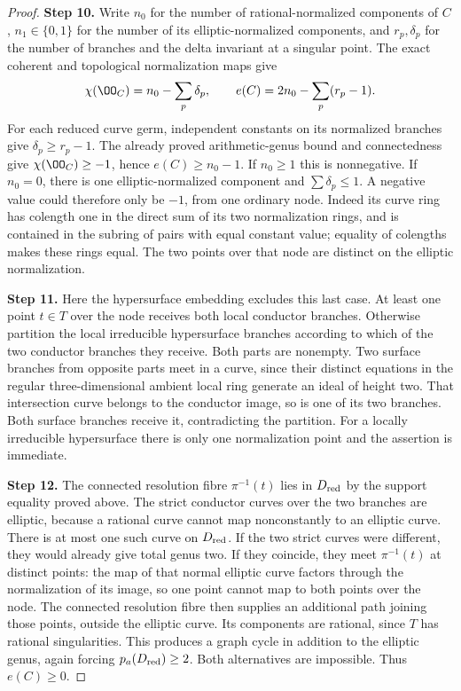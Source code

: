 \begin{proof}
\noindent\textbf{Step 10.} Write $n_0$ for the number of rational-normalized components
of $C$, $n_1\in\{0,1\}$ for the number of its
elliptic-normalized components, and $r_p,\delta_p$ for the
number of branches and the delta invariant at a singular
point. The exact coherent and topological normalization maps
give
\[
 \chi(\OO_C)=n_0-\sum_p\delta_p,
 \qquad e(C)=2n_0-\sum_p(r_p-1).
\]
For each reduced curve germ, independent constants on its
normalized branches give $\delta_p\ge r_p-1$.
The already proved arithmetic-genus bound and connectedness
give $\chi(\OO_C)\ge-1$, hence $e(C)\ge n_0-1$.
If $n_0\ge1$ this is nonnegative. If $n_0=0$, there is
one elliptic-normalized component and
$\sum\delta_p\le1$. A negative value could therefore only
be $-1$, from one ordinary node. Indeed its curve ring has
colength one in the direct sum of its two normalization
rings, and is contained in the subring of pairs with equal
constant value; equality of colengths makes these rings
equal. The two points over that node are distinct on the
elliptic normalization.

\noindent\textbf{Step 11.} Here the hypersurface embedding excludes this last case.
At least one point $t\in T$ over the node receives both
local conductor branches. Otherwise partition the local
irreducible hypersurface branches according to which of
the two conductor branches they receive. Both parts are
nonempty. Two surface branches from opposite parts meet
in a curve, since their distinct equations in the regular
three-dimensional ambient local ring generate an ideal
of height two. That intersection curve belongs to the
conductor image, so is one of its two branches. Both
surface branches receive it, contradicting the partition.
For a locally irreducible hypersurface there is only one
normalization point and the assertion is immediate.

\noindent\textbf{Step 12.} The connected resolution fibre $\pi^{-1}(t)$ lies in
$D_{\rm red}$ by the support equality proved above.
The strict conductor curves over the two branches are
elliptic, because a rational curve cannot map
nonconstantly to an elliptic curve. There is at most one
such curve on $D_{\rm red}$. If the two strict curves
were different, they would already give total genus two.
If they coincide, they meet $\pi^{-1}(t)$ at distinct
points: the map of that normal elliptic curve factors
through the normalization of its image, so one point
cannot map to both points over the node. The connected
resolution fibre then supplies an additional path joining
those points, outside the elliptic curve. Its components
are rational, since $T$ has rational singularities.
This produces a graph cycle in addition to the elliptic
genus, again forcing $p_a(D_{\rm red})\ge2$.
Both alternatives are impossible. Thus $e(C)\ge0$.
\end{proof}



